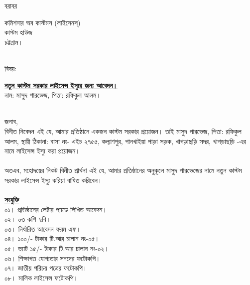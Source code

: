 \documentclass[12pt]{article}
\begin{document}
\noindent
বরাবর
\\
\begin{minipage}[t]{0.06\linewidth}
\hspace{1em}
\end{minipage}
\begin{minipage}[t]{0.94\linewidth}
কমিশনার অব কাস্টমস (লাইসেনস্)
\\
কাস্টম হাউজ
\\
চট্টগ্রাম।
\\
\\
\end{minipage}
\begin{minipage}[t]{0.06\linewidth}
বিষয়:
\end{minipage}
\begin{minipage}[t]{0.94\linewidth}
\textbf{\underline{নতুন কাস্টম সরকার লাইসেন্স ইস্যুর জন্য আবেদন।}}
\\
নাম: মাসুদ পারভেজ, পিতা: রফিকুল আলম।
\\
\\
\end{minipage}
জনাব,
\\
\hspace*{2.7em}বিনীত নিবেদন এই যে,
আমার প্রতিষ্ঠানে একজন কাস্টম সরকার প্রয়োজন।
তাই মাসুদ পারভেজ, পিতা: রফিকুল আলম,
স্থায়ী ঠিকানা: বাসা নং- এইচ ২৭৫৫,
কল্যাণপুর, পানখাইয়া পাড়া সড়ক,
খাগড়াছড়ি সদর, খাগড়াছড়ি -এর নামে
লাইসেন্স ইস্যু করা প্রয়োজন।
\\
\\
অতএব, মহোদয়ের নিকট বিনীত প্রার্থনা এই যে,
আমার প্রতিষ্ঠানের অনুকূলে মাসুদ পারভেজের নামে
নতুন কাস্টম সরকার লাইসেন্স ইস্যু করিয়া
বাধিত করিবেন।
\\
\\
\textbf{\underline{সংযুক্তি}}
\\
০১।  প্রতিষ্ঠানের লেটার প্যাডে লিখিত আবেদন।
\\
০২। ০৩ কপি ছবি।
\\
০৩। নির্ধারিত আবেদন ফরম এফ।
\\
০৪। ১০০/- টাকার টি.আর চালান নং-০৫।
\\
০৫। ভ্যাট ১৫/- টাকার টি.আর চালান নং-০২।
\\
০৬। শিক্ষাগত যোগ্যতার সনদের ফটোকপি।
\\
০৭। জাতীয় পরিচয় পত্রের ফটোকপি।
\\
০৮। মালিক লাইসেন্স ফটোকপি।

\thispagestyle{laststyle}
\end{document}
